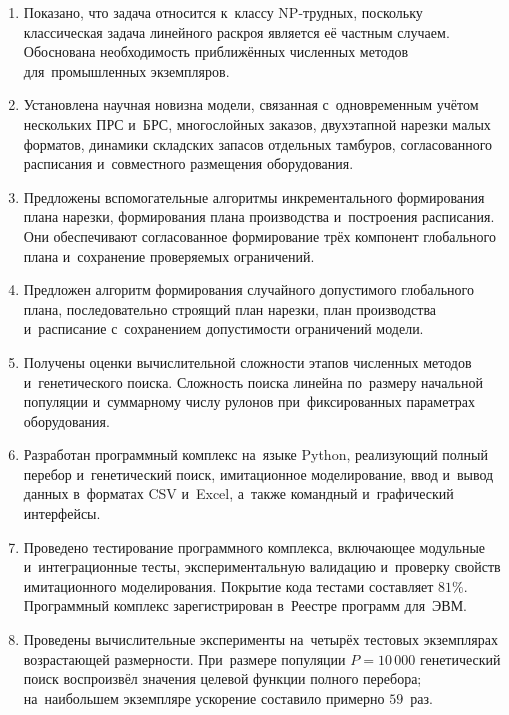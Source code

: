 \begin{enumerate}
  \item Показано, что задача относится к~классу NP-трудных, поскольку классическая задача линейного раскроя является её частным случаем. Обоснована необходимость приближённых численных методов для~промышленных экземпляров.

  \item Установлена научная новизна модели, связанная с~одновременным учётом нескольких ПРС и~БРС, многослойных заказов, двухэтапной нарезки малых форматов, динамики складских запасов отдельных тамбуров, согласованного расписания и~совместного размещения оборудования.

  \item Предложены вспомогательные алгоритмы инкрементального формирования плана нарезки, формирования плана производства и~построения расписания. Они обеспечивают согласованное формирование трёх компонент глобального плана и~сохранение проверяемых ограничений.

  \item Предложен алгоритм формирования случайного допустимого глобального плана, последовательно строящий план нарезки, план производства и~расписание с~сохранением допустимости ограничений модели.

  \item Получены оценки вычислительной сложности этапов численных методов и~генетического поиска. Сложность поиска линейна по~размеру начальной популяции и~суммарному числу рулонов при~фиксированных параметрах оборудования.

  \item Разработан программный комплекс на~языке Python, реализующий полный перебор и~генетический поиск, имитационное моделирование, ввод и~вывод данных в~форматах CSV и~Excel, а~также командный и~графический интерфейсы.

  \item Проведено тестирование программного комплекса, включающее модульные и~интеграционные тесты, экспериментальную валидацию и~проверку свойств имитационного моделирования. Покрытие кода тестами составляет $81\%$. Программный комплекс зарегистрирован в~Реестре программ для~ЭВМ.

  \item Проведены вычислительные эксперименты на~четырёх тестовых экземплярах возрастающей размерности. При~размере популяции $P=10\,000$ генетический поиск воспроизвёл значения целевой функции полного перебора; на~наибольшем экземпляре ускорение составило примерно $59$~раз.


\end{enumerate}
